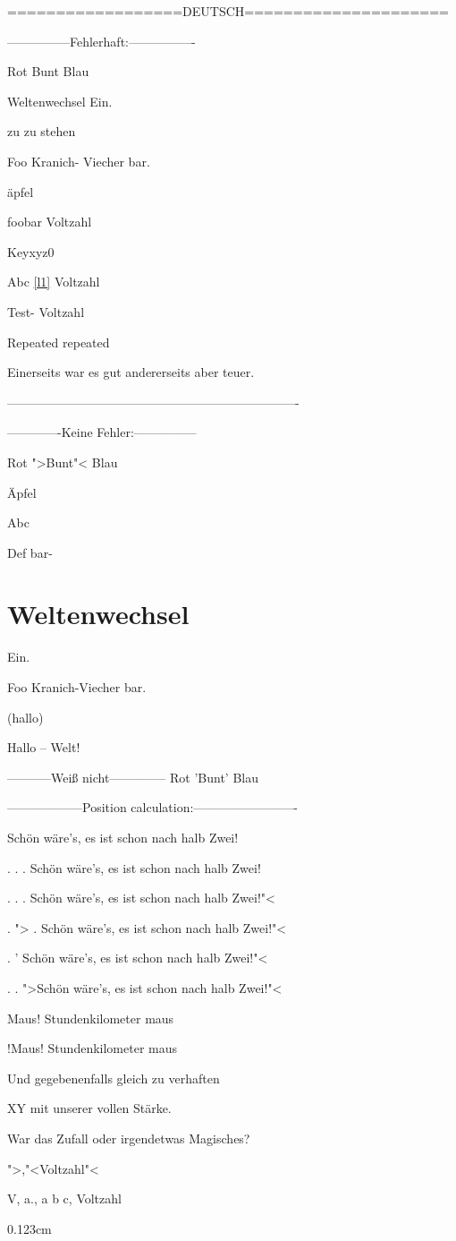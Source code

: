 
==================DEUTSCH=====================

---------------Fehlerhaft:----------------



Rot Bunt Blau


Weltenwechsel Ein.


zu zu stehen


Foo Kranich- Viecher bar. 


\"{a}pfel

\cite{keylist} foobar Voltzahl

Keyxyz0 \cite{keylist}

Abc \label{l1}\ref{l1}\label{l2} Voltzahl

Test-\label{key} Voltzahl


Repeated
repeated

Einerseits war es gut andererseits aber teuer. 


----------------------------------------------------------------------

-------------Keine Fehler:---------------



Rot ">Bunt"< Blau


\"{A}pfel

Abc %

Def bar-%

\chapter{Weltenwechsel}
Ein.





Foo Kranich-Viecher bar. 


(hallo)

Hallo -- Welt!


-----------Weiß nicht--------------
Rot 'Bunt' Blau




------------------Position calculation:-------------------------

Schön wäre's, es ist schon nach halb Zwei!

. . . Schön wäre's, es ist schon nach halb Zwei! 

. . . Schön wäre's, es ist schon nach halb Zwei!"< 

. "> . Schön wäre's, es ist schon nach halb Zwei!"< 

. ' Schön wäre's, es ist schon nach halb Zwei!"< 

. . ">Schön wäre's, es ist schon nach halb Zwei!"< 


Maus! Stundenkilometer maus


!Maus! Stundenkilometer maus

Und gegebenenfalls gleich zu verhaften

XY mit unserer vollen Stärke.

War das Zufall oder irgendetwas Magisches?

      ">,"<Voltzahl"< 

V, a., a b c, Voltzahl

0.123cm